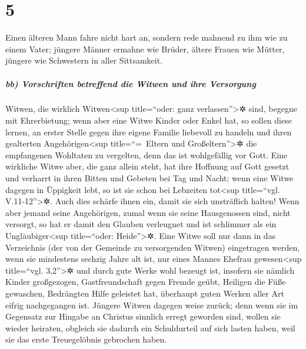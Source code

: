 \hypertarget{section-4}{%
\section{5}\label{section-4}}

 Einen älteren Mann fahre nicht hart an, sondern rede
mahnend zu ihm wie zu einem Vater; jüngere Männer ermahne wie Brüder,
 ältere Frauen wie Mütter, jüngere wie Schwestern in aller
Sittsamkeit.

\hypertarget{bb-vorschriften-betreffend-die-witwen-und-ihre-versorgung}{%
\subparagraph{bb) Vorschriften betreffend die Witwen und ihre
Versorgung}\label{bb-vorschriften-betreffend-die-witwen-und-ihre-versorgung}}

 Witwen, die wirklich Witwen\textless sup title=``oder:
ganz verlassen''\textgreater✲ sind, begegne mit Ehrerbietung;
 wenn aber eine Witwe Kinder oder Enkel hat, so sollen
diese lernen, an erster Stelle gegen ihre eigene Familie liebevoll zu
handeln und ihren gealterten Angehörigen\textless sup title=``=~Eltern
und Großeltern''\textgreater✲ die empfangenen Wohltaten zu vergelten,
denn das ist wohlgefällig vor Gott.  Eine wirkliche Witwe
aber, die ganz allein steht, hat ihre Hoffnung auf Gott gesetzt und
verharrt in ihren Bitten und Gebeten bei Tag und Nacht; 
wenn eine Witwe dagegen in Üppigkeit lebt, so ist sie schon bei
Lebzeiten tot\textless sup title=``vgl. V.11-12''\textgreater✲.
 Auch dies schärfe ihnen ein, damit sie sich unsträflich
halten!  Wenn aber jemand seine Angehörigen, zumal wenn
sie seine Hausgenossen sind, nicht versorgt, so hat er damit den Glauben
verleugnet und ist schlimmer als ein Ungläubiger\textless sup
title=``oder: Heide''\textgreater✲.  Eine Witwe soll nur
dann in das Verzeichnis (der von der Gemeinde zu versorgenden Witwen)
eingetragen werden, wenn sie mindestens sechzig Jahre alt ist, nur eines
Mannes Ehefrau gewesen\textless sup title=``vgl. 3,2''\textgreater✲
 und durch gute Werke wohl bezeugt ist, insofern sie
nämlich Kinder großgezogen, Gastfreundschaft gegen Fremde geübt,
Heiligen die Füße gewaschen, Bedrängten Hilfe geleistet hat, überhaupt
guten Werken aller Art eifrig nachgegangen ist.  Jüngere
Witwen dagegen weise zurück; denn wenn sie im Gegensatz zur Hingabe an
Christus sinnlich erregt geworden sind, wollen sie wieder heiraten,
 obgleich sie dadurch ein Schuldurteil auf sich lasten
haben, weil sie das erste Treuegelöbnis gebrochen haben. 
